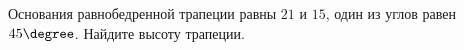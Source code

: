 \begin{ex}
	\begin{condition}
		 Основания равнобедренной трапеции равны \( 21  \) и \( 15 \), один из углов равен \( 45  \degree\). Найдите высоту трапеции.
	\end{condition}
\end{ex}